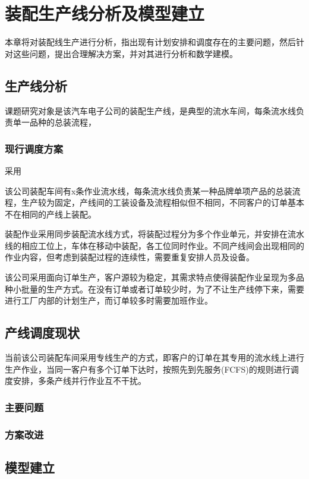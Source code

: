 \chapter{装配生产线分析及模型建立}
本章将对装配线生产进行分析，指出现有计划安排和调度存在的主要问题，然后针对这些问题，提出合理解决方案，并对其进行分析和数学建模。
\section{生产线分析}
课题研究对象是该汽车电子公司的装配生产线，是典型的流水车间，每条流水线负责单一品种的总装流程，
\subsection{现行调度方案}
采用

该公司装配车间有x条作业流水线，每条流水线负责某一种品牌单项产品的总装流程，生产较为固定，产线间的工装设备及流程相似但不相同，不同客户的订单基本不在相同的产线上装配。

装配作业采用同步装配流水线方式，将装配过程分为多个作业单元，并安排在流水线的相应工位上，车体在移动中装配，各工位同时作业。不同产线间会出现相同的作业内容，但考虑到装配过程的连续性，需要重复安排人员及设备。

该公司采用面向订单生产，客户源较为稳定，其需求特点使得装配作业呈现为多品种小批量的生产方式。在没有订单或者订单较少时，为了不让生产线停下来，需要进行工厂内部的计划生产，而订单较多时需要加班作业。

\section{产线调度现状}
当前该公司装配车间采用专线生产的方式，即客户的订单在其专用的流水线上进行生产作业，当同一客户有多个订单下达时，按照先到先服务(FCFS)的规则进行调度安排，多条产线并行作业互不干扰。

\subsection{主要问题}

\subsection{方案改进}

\section{模型建立}
